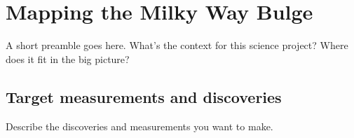 %
%
%
%
%
%
%

\section{Mapping the Milky Way Bulge}
\def\secname{MW_Bulge}\label{sec:\secname} %



A short preamble goes here. What's the context for this science
project? Where does it fit in the big picture?


\subsection{Target measurements and discoveries}
\label{sec:keyword:MW_Bulge_targets}

Describe the discoveries and measurements you want to make.

